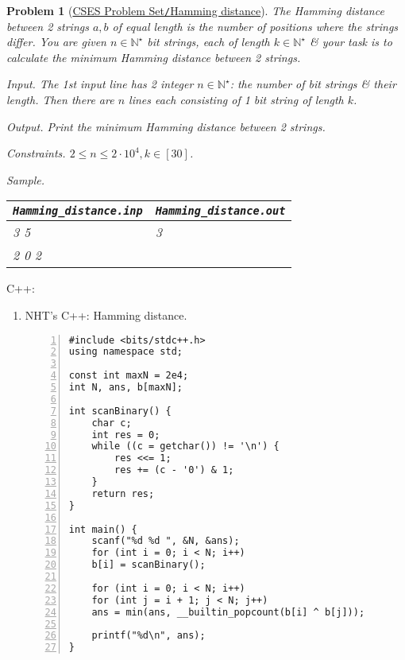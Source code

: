\documentclass{article}
\newtheorem{problem}{Problem}
\begin{document}
\begin{problem}[\href{https://cses.fi/problemset/task/2136}{CSES Problem Set{\tt/}Hamming distance}]
    The Hamming distance between 2 strings $a,b$ of equal length is the number of positions where the strings differ. You are given $n\in\mathbb{N}^\star$ bit strings, each of length $k\in\mathbb{N}^\star$ \& your task is to calculate the minimum Hamming distance between 2 strings.
    \item {\sf Input.} The 1st input line has 2  integer $n\in\mathbb{N}^\star$: the number of bit strings \& their length. Then there are $n$ lines each consisting of 1 bit string of length $k$.
    \item {\sf Output.} Print the minimum Hamming distance between 2 strings.
    \item {\sf Constraints.} $2\le n\le2\cdot10^4,k\in[30]$.
    \item {\sf Sample.}
    \begin{table}[H]
        \centering
        \begin{tabular}{|l|l|}
            \hline
            \verb|Hamming_distance.inp| & \verb|Hamming_distance.out| \\
            \hline
            3 5 & 3 \\
            2 0 2 & \\
            \hline
        \end{tabular}
    \end{table}
\end{problem}
C++:
\begin{enumerate}
    \item NHT's C++: Hamming distance.
    \begin{Verbatim}[numbers=left,xleftmargin=5mm]
#include <bits/stdc++.h>
using namespace std;

const int maxN = 2e4;
int N, ans, b[maxN];

int scanBinary() {
    char c;
    int res = 0;
    while ((c = getchar()) != '\n') {
        res <<= 1;
        res += (c - '0') & 1;
    }
    return res;
}

int main() {
    scanf("%d %d ", &N, &ans);
    for (int i = 0; i < N; i++)
    b[i] = scanBinary();
    
    for (int i = 0; i < N; i++)
    for (int j = i + 1; j < N; j++)
    ans = min(ans, __builtin_popcount(b[i] ^ b[j]));
    
    printf("%d\n", ans);
}
    \end{Verbatim}
\end{enumerate}
\end{document}
